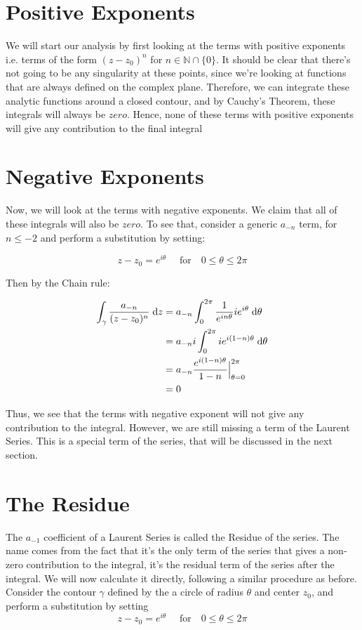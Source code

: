 \documentclass[12pt, letterpaper]{article}
\begin{document}
\section*{Positive Exponents}

We will start our analysis by first looking at the terms with positive exponents i.e. terms of the form \( (z - z_{0})^n\) for \(n \in \mathbb{N} \cap \{0\}\). It should be clear that there’s not going to be any singularity at these points, since we’re looking at functions that are always defined on the complex plane. Therefore, we can integrate these analytic functions around a closed contour, and by Cauchy's Theorem, these integrals will always be \(zero\). Hence, none of these terms with positive exponents will give any contribution to the final integral
\bigskip

\section*{Negative Exponents}

Now, we will look at the terms with negative exponents. We claim that all of these integrals will also be \(zero\). To see that, consider a generic \( a_{-n}\) term, for \(n \leq -2\) and perform a substitution by setting:

\[z - z_{0} = e^{i\theta} \quad \text{ for}  \quad 0 \leq \theta \leq 2\pi \]

\noindent
Then by the Chain rule: 

\begin{align*}
\centering 
\int_{\gamma}^{} \frac{a_{-n}}{(z - z_{0})^n} \;\mathrm{d}z &= a_{-n}\int_{0}^{2\pi} \frac{1}{e^{in\theta}} ie^{i\theta} \;\mathrm{d}\theta \\
&= a_{-n}i\int_{0}^{2\pi} ie^{i(1-n)\theta} \;\mathrm{d}\theta \\
&= a_{-n} \frac{e^{i(1-n)\theta}}{1-n} \Big|_{\theta = 0}^{2\pi} \\
&= 0
\end{align*}

\noindent
Thus, we see that the terms with negative exponent will not give any contribution to the integral. However, we are still missing a term of the Laurent Series. This is a special term of the series, that will be discussed in the next section.
\bigskip

\section*{The Residue}
The \(a_{-1}\) coefficient of a Laurent Series is called the Residue of the series. The name comes from the fact that it's the only term of the series that gives a non-zero contribution to the integral, it's the residual term of the series after the integral. We will now calculate it directly, following a similar procedure as before. Consider the contour \(\gamma\) defined by the a circle of radius \(\theta\) and center \(z_{0}\), and perform a substitution by setting 
\[z - z_{0} = e^{i\theta} \quad \text{ for}  \quad 0 \leq \theta \leq 2\pi \]
\end{document}
